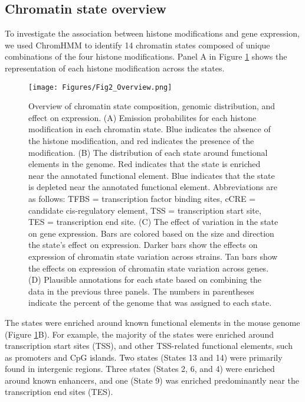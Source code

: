 \documentclass[
  11pt,
]{article}
\begin{document}
\hypertarget{chromatin-state-overview}{%
\subsection{Chromatin state overview}\label{chromatin-state-overview}}

To investigate the association between histone modifications and gene
expression, we used ChromHMM to identify 14 chromatin states composed of
unique combinations of the four histone modifications. Panel A in Figure
\ref{fig:state_overview} shows the representation of each histone
modification across the states.

\begin{figure}[ht!]
\texttt{[image: Figures/Fig2\_Overview.png]} 
\caption{Overview of chromatin state composition, genomic 
distribution, and effect on expression. (A) Emission 
probabilites for each histone modification in each 
chromatin state. Blue indicates the absence of the histone
modification, and red indicates the presence of the 
modification. (B) The distribution of each state around 
functional elements in the genome. Red indicates that the 
state is enriched near the annotated functional element. 
Blue indicates that the state is depleted near the annotated 
functional element. Abbreviations are as follows: 
TFBS = transcription factor binding sites, cCRE = candidate 
cis-regulatory element, TSS = transcription 
start site, TES = transcription end site. (C) The effect of 
variation in the state on gene expression. Bars are colored 
based on the size and direction the state's effect on expression. 
Darker bars show the effects on expression of chromatin state 
variation across strains. Tan bars show the effects on expression 
of chromatin state variation across genes. (D) Plausible 
annotations for each state based on combining the data in 
the previous three panels. The numbers in parentheses indicate 
the percent of the genome that was assigned to each state.}
\label{fig:state_overview}
\end{figure}

The states were enriched around known functional elements in the mouse
genome (Figure \ref{fig:state_overview}B). For example, the majority of
the states were enriched around transcription start sites (TSS), and
other TSS-related functional elements, such as promoters and CpG
islands. Two states (States 13 and 14) were primarily found in
intergenic regions. Three states (States 2, 6, and 4) were enriched
around known enhancers, and one (State 9) was enriched predominantly
near the transcription end sites (TES).
\end{document}
